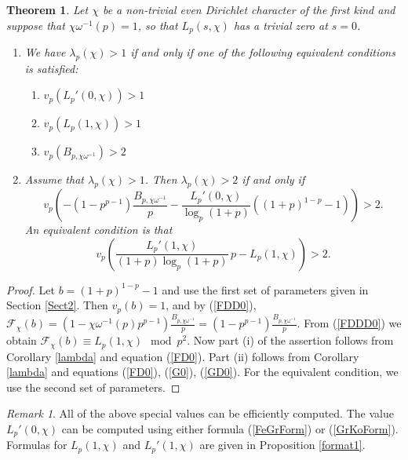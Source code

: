 \documentclass[pdflatex,sn-mathphys-num]{sn-jnl}%
\theoremstyle{plain}
\newtheorem{thm}{Theorem}[section]
\theoremstyle{definition}
\theoremstyle{remark}
\newtheorem*{rem*}{Remark}
\numberwithin{equation}{section}
\begin{document}
\begin{thm} Let $\chi$ be a non-trivial even Dirichlet character of the first kind and suppose that $\chi \omega^{-1} (p) = 1 $, so that $L_p(s,\chi)$ has a trivial zero at $s=0$.
\begin{enumerate}
\item[(i)] We have $\lambda_p(\chi) > 1$ if and only if one of the following equivalent conditions is satisfied:
\begin{enumerate}
\item[(a)] $v_p ( L_p'(0,\chi) ) > 1$
\item[(b)] $v_p(L_p(1,\chi)) > 1 $ 
\item[(c)] $ v_p ( B_{p, \chi \omega^{-1}}) > 2  $
\end{enumerate}
\item[(ii)] Assume that $\lambda_p(\chi) > 1$. 
Then $\lambda_p(\chi) > 2$ if and only if 
$$ v_p \left( - ( 1-  p^{p-1} )  \frac{B_{p, \chi \omega^{-1}}} {p}  - \frac{ L_p'(0,\chi)}{\log_p(1+p)} ( (1+p)^{1-p} -1) \right) > 2 .$$
An equivalent condition is that
$$ v_p \left( \frac{ L_p'(1,\chi)} { (1+p) \log_p ( 1+p) }\, p - L_p(1,\chi) \right) > 2 . $$

\end{enumerate}
\label{theorem-trivial}
\end{thm}

\begin{proof} 
Let $b=(1+p)^{1-p}-1$ and use the first set of parameters given in Section \ref{Sect2}. Then $v_p(b)=1$, and by (\ref{FDD0}), 
$\mathcal{F}_{\chi}(b) = ( 1- \chi \omega^{-1}(p) p^{p-1} )  \frac{B_{p, \chi \omega^{-1}}} {p} =  ( 1- p^{p-1} )  \frac{B_{p, \chi \omega^{-1}}} {p}$. 
From (\ref{FDDD0}) we obtain $\mathcal{F}_{\chi}(b) \equiv L_p(1,\chi) \mod p^2$.
Now part (i) of the assertion follows from Corollary  \ref{lambda} and equation (\ref{FD0}). Part (ii) follows from Corollary \ref{lambda} and equations (\ref{FD0}), (\ref{G0}), (\ref{GD0}).
For the equivalent condition, we use the second set of parameters.
\end{proof}

\begin{rem*} All of the above special values can be efficiently computed.  The value $L_p'(0,\chi)$ can be computed using either formula (\ref{FeGrForm}) or (\ref{GrKoForm}).
 Formulas for $L_p(1,\chi)$ and $L_p'(1,\chi)$ are given in Proposition \ref{format1}.
 
\end{rem*}
\end{document}
